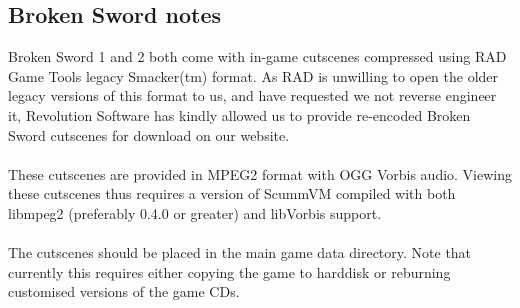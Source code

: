 \subsection {Broken Sword notes}
Broken Sword 1 and 2 both come with in-game cutscenes compressed using 
RAD Game Tools legacy Smacker(tm) format. As RAD is unwilling to open
the older legacy versions of this format to us, and have requested we not
reverse engineer it, Revolution Software has kindly allowed us to provide
re-encoded Broken Sword cutscenes for download on our website.\\
\quad\\
These cutscenes are provided in MPEG2 format with OGG Vorbis audio.
Viewing these cutscenes thus requires a version of ScummVM compiled 
with both libmpeg2 (preferably 0.4.0 or greater) and libVorbis support.\\
\quad\\
The cutscenes should be placed in the main game data directory. Note that
currently this requires either copying the game to harddisk or reburning
customised versions of the game CDs.
